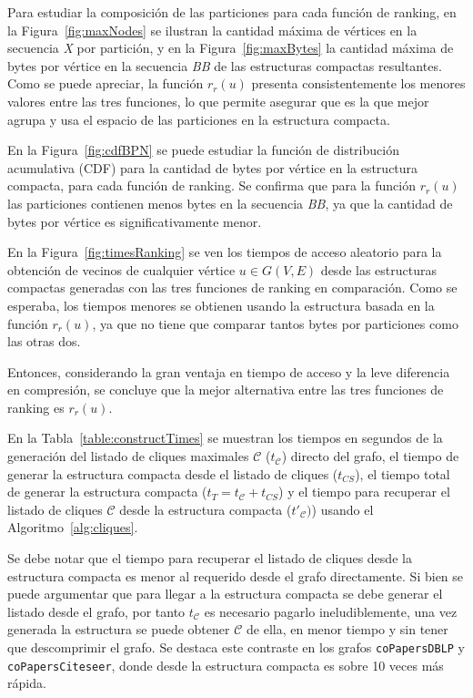 

Para estudiar la composición de las particiones para cada función de ranking, en la Figura~\ref{fig:maxNodes} se ilustran la cantidad máxima de vértices en la secuencia \textit{X} por partición, y en la Figura~\ref{fig:maxBytes} la cantidad máxima de bytes por vértice en la secuencia \textit{BB} de las estructuras compactas resultantes. Como se puede apreciar, la función $r_{r}(u)$ presenta consistentemente los menores valores entre las tres funciones, lo que permite asegurar que es la que mejor agrupa y usa el espacio de las particiones en la estructura compacta.




En la Figura~\ref{fig:cdfBPN} se puede estudiar la función de distribución acumulativa (CDF) para la cantidad de bytes por vértice en la estructura compacta, para cada función de ranking. Se confirma que para la función $r_{r}(u)$ las particiones contienen menos bytes en la secuencia \textit{BB}, ya que la cantidad de bytes por vértice es significativamente menor.


%


En la Figura~\ref{fig:timesRanking} se ven los tiempos de acceso aleatorio para la obtención de vecinos de cualquier vértice $u \in G(V, E)$ desde las estructuras compactas generadas con las tres funciones de ranking en comparación. Como se esperaba, los tiempos menores se obtienen usando la estructura basada en la función $r_{r}(u)$, ya que no tiene que comparar tantos bytes por particiones como las otras dos.



Entonces, considerando la gran ventaja en tiempo de acceso y la leve diferencia en compresión, se concluye que la mejor alternativa entre las tres funciones de ranking es $r_{r}(u)$. 

En la Tabla~\ref{table:constructTimes} se muestran los tiempos en segundos de la generación del listado de cliques maximales $\mathcal{C}$ ($t_{\mathcal{C}}$) directo del grafo, el tiempo de generar la estructura compacta desde el listado de cliques ($t_{CS}$), el tiempo total de generar la estructura compacta ($t_{T} = t_{\mathcal{C}} + t_{CS}$) y el tiempo para recuperar el listado de cliques $\mathcal{C}$ desde la estructura compacta ($t'_{\mathcal{C}})$) usando el Algoritmo~\ref{alg:cliques}. 

Se debe notar que el tiempo para recuperar el listado de cliques desde la estructura compacta es menor al requerido desde el grafo directamente. Si bien se puede argumentar que para llegar a la estructura compacta se debe generar el listado desde el grafo, por tanto $t_{\mathcal{C}}$ es necesario pagarlo ineludiblemente, una vez generada la estructura se puede obtener $\mathcal{C}$ de ella, en menor tiempo y sin tener que descomprimir el grafo. Se destaca este contraste en los grafos \texttt{coPapersDBLP} y \texttt{coPapersCiteseer}, donde desde la estructura compacta es sobre 10 veces más rápida.

